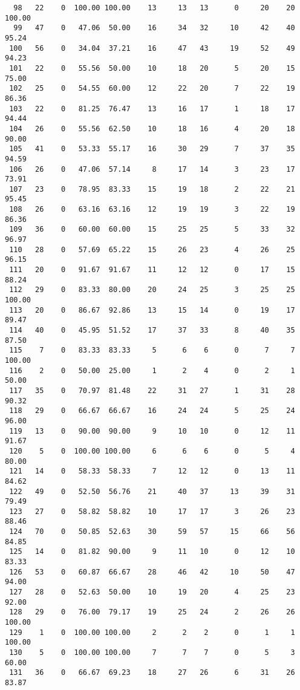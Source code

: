 \begin{verbatim}
  98   22    0  100.00 100.00    13     13   13      0     20    20   100.00
  99   47    0   47.06  50.00    16     34   32     10     42    40    95.24
 100   56    0   34.04  37.21    16     47   43     19     52    49    94.23
 101   22    0   55.56  50.00    10     18   20      5     20    15    75.00
 102   25    0   54.55  60.00    12     22   20      7     22    19    86.36
 103   22    0   81.25  76.47    13     16   17      1     18    17    94.44
 104   26    0   55.56  62.50    10     18   16      4     20    18    90.00
 105   41    0   53.33  55.17    16     30   29      7     37    35    94.59
 106   26    0   47.06  57.14     8     17   14      3     23    17    73.91
 107   23    0   78.95  83.33    15     19   18      2     22    21    95.45
 108   26    0   63.16  63.16    12     19   19      3     22    19    86.36
 109   36    0   60.00  60.00    15     25   25      5     33    32    96.97
 110   28    0   57.69  65.22    15     26   23      4     26    25    96.15
 111   20    0   91.67  91.67    11     12   12      0     17    15    88.24
 112   29    0   83.33  80.00    20     24   25      3     25    25   100.00
 113   20    0   86.67  92.86    13     15   14      0     19    17    89.47
 114   40    0   45.95  51.52    17     37   33      8     40    35    87.50
 115    7    0   83.33  83.33     5      6    6      0      7     7   100.00
 116    2    0   50.00  25.00     1      2    4      0      2     1    50.00
 117   35    0   70.97  81.48    22     31   27      1     31    28    90.32
 118   29    0   66.67  66.67    16     24   24      5     25    24    96.00
 119   13    0   90.00  90.00     9     10   10      0     12    11    91.67
 120    5    0  100.00 100.00     6      6    6      0      5     4    80.00
 121   14    0   58.33  58.33     7     12   12      0     13    11    84.62
 122   49    0   52.50  56.76    21     40   37     13     39    31    79.49
 123   27    0   58.82  58.82    10     17   17      3     26    23    88.46
 124   70    0   50.85  52.63    30     59   57     15     66    56    84.85
 125   14    0   81.82  90.00     9     11   10      0     12    10    83.33
 126   53    0   60.87  66.67    28     46   42     10     50    47    94.00
 127   28    0   52.63  50.00    10     19   20      4     25    23    92.00
 128   29    0   76.00  79.17    19     25   24      2     26    26   100.00
 129    1    0  100.00 100.00     2      2    2      0      1     1   100.00
 130    5    0  100.00 100.00     7      7    7      0      5     3    60.00
 131   36    0   66.67  69.23    18     27   26      6     31    26    83.87

\end{verbatim}
